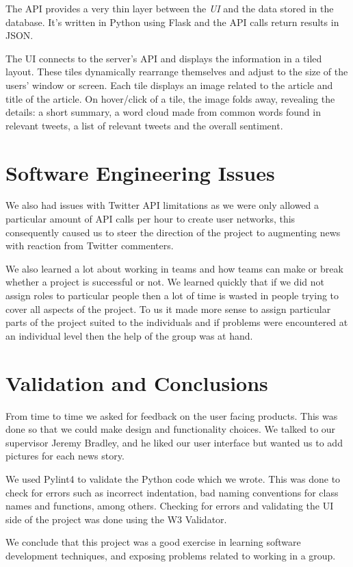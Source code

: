 \documentclass[a4paper,12pt]{article}
\begin{document}
	 The API provides a very thin layer between the \emph{UI} and the data stored in the database. It's written in Python using Flask and the API calls return results in JSON.
	 
	 The UI connects to the server's API and displays the information in a tiled layout. These tiles dynamically rearrange themselves and adjust to the size of the users' window or screen. Each tile displays an image related to the article and title of the article. On hover/click of a tile, the image folds away, revealing the details: a short summary, a word cloud made from common words found in relevant tweets, a list of relevant tweets and the overall sentiment.
  
  \section{Software Engineering Issues}
  
  We also had issues with Twitter API limitations as we were only allowed a particular amount of API calls per hour to create user networks, this consequently caused us to steer the direction of the project to augmenting news with reaction from Twitter commenters.
  
  We also learned a lot about working in teams and how teams can make or break whether a project is successful or not. We learned quickly that if we did not assign roles to particular people then a lot of time is wasted in people trying to cover all aspects of the project. To us it made more sense to assign particular parts of the project suited to the individuals and if problems were encountered at an individual level then the help of the group was at hand.
  
  \section{Validation and Conclusions}
  
	From time to time we asked for feedback on the user facing products. This was done so that we could make design and functionality choices. We talked to our supervisor Jeremy Bradley, and he liked our user interface but wanted us to add pictures for each news story.
	
	We used Pylint4 to validate the Python code which we wrote. This was done to check for errors such as incorrect indentation, bad naming conventions for class names and functions, among others. Checking for errors and validating the UI side of the project was done using the W3 Validator.
	
	We conclude that this project was a good exercise in learning software development techniques, and exposing problems related to working in a group.
  
\end{document}
